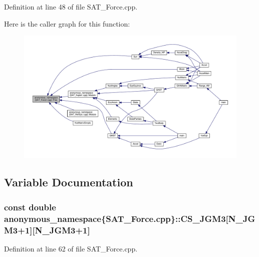 Definition at line 48 of file S\-A\-T\-\_\-\-Force.\-cpp.



Here is the caller graph for this function\-:\nopagebreak
\begin{figure}[H]
\begin{center}
\leavevmode
\includegraphics[width=350pt]{namespaceanonymous__namespace_02SAT__Force_8cpp_03_aa6826b33621fa6ff5736c6432c487c1a_icgraph}
\end{center}
\end{figure}




\subsection{Variable Documentation}
\hypertarget{namespaceanonymous__namespace_02SAT__Force_8cpp_03_a5d47d698acd0c2506ccfc42cdc162bf7}{
\subsubsection[{C\-S\-\_\-\-J\-G\-M3}]{\setlength{\rightskip}{0pt plus 5cm}const double anonymous\-\_\-namespace\{S\-A\-T\-\_\-\-Force.\-cpp\}\-::C\-S\-\_\-\-J\-G\-M3\mbox{[}{\bf N\-\_\-\-J\-G\-M3}+1\mbox{]}\mbox{[}{\bf N\-\_\-\-J\-G\-M3}+1\mbox{]}}}\label{namespaceanonymous__namespace_02SAT__Force_8cpp_03_a5d47d698acd0c2506ccfc42cdc162bf7}


Definition at line 62 of file S\-A\-T\-\_\-\-Force.\-cpp.

